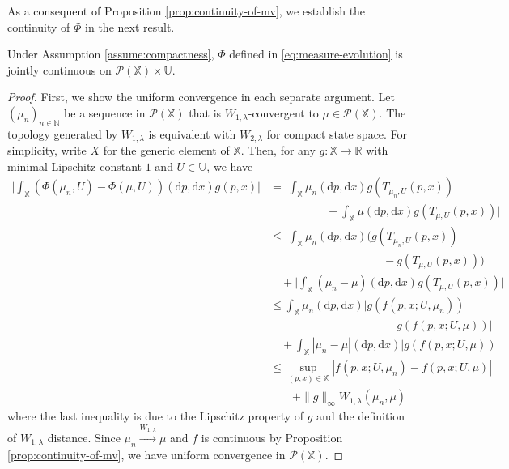 \documentclass[11pt]{article}
\newcommand{\RR}{\mathbb{R}}
\newcommand{\NN}{\mathbb{N}}
\newcommand{\XX}{\mathbb{X}}
\newcommand{\UU}{\mathbb{U}}
\newcommand{\cP}{\mathcal{P}}
\newcommand{\de}{\mathrm{d}} %
\begin{document}
As a consequent of Proposition \ref{prop:continuity-of-mv}, we establish the continuity of $\Phi$ in the next result.
\begin{proposition}\label{prop:phi-continuity}
    Under Assumption \ref{assume:compactness}, $\Phi$ defined in \eqref{eq:measure-evolution} is jointly continuous on $\cP(\XX)\times\UU$.
\end{proposition}
\begin{proof}
    First, we show the uniform convergence in each separate argument. Let $(\mu_n)_{n\in\NN}$ be a sequence in $\cP(\XX)$ that is $W_{1,\lambda}$-convergent to $\mu\in\cP(\XX)$. The topology generated by $W_{1,\lambda}$ is equivalent with $W_{2,\lambda}$ for compact state space. For simplicity, write $X$ for the generic element of $\XX$. Then, for any $g:\XX\to\RR$ with minimal Lipschitz constant $1$ and $U\in\UU$, we have
    \begin{align*}
        \bigg|\int_\XX (\Phi(\mu_n, U)-\Phi(\mu, U))(\de p, \de x) g(p,x)\bigg| &=  \bigg|\int_\XX \mu_n(\de p, \de x) g(T_{\mu_n, U}(p,x)) \\
        &\hspace{5em}-\int_\XX \mu(\de p, \de x)g(T_{\mu, U}(p, x))\bigg|\\
        &\leq \bigg|\int_\XX\mu_n(\de p, \de x) \big(g(T_{\mu_n, U}(p,x)) \\
        &\hspace{10em}- g(T_{\mu,U}(p,x))\big)\bigg| \\
        &\quad+ \bigg|\int_\XX (\mu_n-\mu)(\de p,\de x)g(T_{\mu, U}(p,x))\bigg|\\
        &\leq \int_\XX \mu_n(\de p, \de x)|g(f(p,x; U, \mu_n))\\
        &\hspace{10em}-g(f(p,x; U, \mu))| \\
        &\quad+\int_\XX|\mu_n-\mu|(\de p, \de x)|g(f(p,x; U, \mu))|\\
        &\leq \sup_{(p,x)\in\XX}|f(p,x; U, \mu_n) - f(p,x; U, \mu)|\\
        &\qquad+ \|g\|_{\infty}W_{1,\lambda}(\mu_n, \mu)
    \end{align*}
    where the last inequality is due to the Lipschitz property of $g$ and the definition of $W_{1,\lambda}$ distance. Since $\mu_n\xrightarrow{W_{1,\lambda}}\mu$ and $f$ is continuous by Proposition \ref{prop:continuity-of-mv}, we have uniform convergence in $\cP(\XX)$.


\end{proof}
\end{document}

